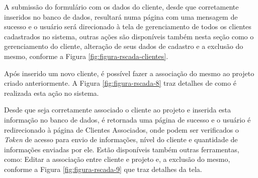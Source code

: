 A submissão do formulário com os dados do cliente, desde que corretamente inseridos no banco de dados, resultará numa página com uma mensagem de sucesso e o usuário será direcionado à tela de gerenciamento de todos os clientes cadastrados no sistema, outras ações são disponíveis também nesta seção como o gerenciamento do cliente, alteração de seus dados de cadastro e a exclusão do mesmo, conforme a Figura \ref{fig:figura-rscada-clientes}.
    	
    	\begin{figure}[!h]
    	\end{figure}
    	
Após inserido um novo cliente, é possível fazer a associação do mesmo ao projeto criado anteriormente. A Figura \ref{fig:figura-rscada-8} traz detalhes de como é realizada esta ação no sistema.
    	
        \begin{figure}[!h]
    	\end{figure}

Desde que seja corretamente associado o cliente ao projeto e inserida esta informação no banco de dados, é retornada uma página de sucesso e o usuário é redirecionado à página de Clientes Associados, onde podem ser verificados o \textit{Token} de acesso para envio de informações, nível do cliente e quantidade de informações enviadas por ele. Estão disponíveis também outras ferramentas, como: Editar a associação entre cliente e projeto e, a exclusão do mesmo, conforme a Figura \ref{fig:figura-rscada-9} que traz detalhes da tela.

        \begin{figure}[!h]
    	\end{figure}